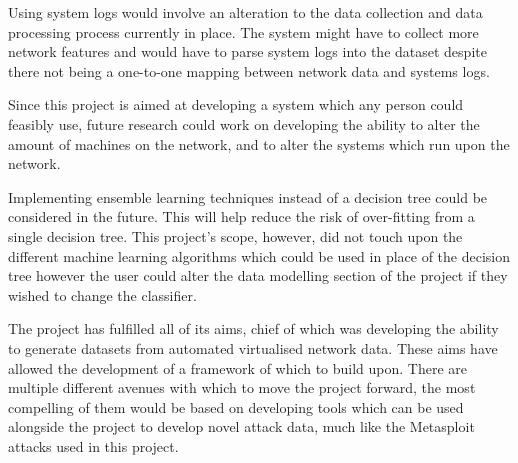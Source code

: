 Using system logs would involve an alteration to the data collection and data processing process currently in place. The system might have to collect more network features and would have to parse system logs into the dataset despite there not being a one-to-one mapping between network data and systems logs.

Since this project is aimed at developing a system which any person could feasibly use, future research could work on developing the ability to alter the amount of machines on the network, and to alter the systems which run upon the network. 

Implementing ensemble learning techniques instead of a decision tree could be considered in the future. This will help reduce the risk of over-fitting from a single decision tree. This project’s scope, however, did not touch upon the different machine learning algorithms which could be used in place of the decision tree however the user could alter the data modelling section of the project if they wished to change the classifier.

The project has fulfilled all of its aims, chief of which was developing the ability to generate datasets from automated virtualised network data. These aims have allowed the development of a framework of which to build upon. There are multiple different avenues with which to move the project forward, the most compelling of them would be based on developing tools which can be used alongside the project to develop novel attack data, much like the Metasploit attacks used in this project. 

